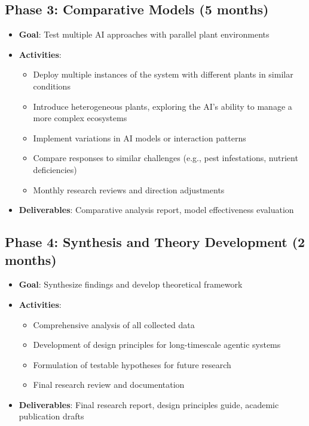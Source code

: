 \documentclass[12pt,letterpaper]{article}
\begin{document}
\subsection{Phase 3: Comparative Models (5 months)}
\begin{itemize}
    \item \textbf{Goal}: Test multiple AI approaches with parallel plant environments
    \item \textbf{Activities}:
    \begin{itemize}
        \item Deploy multiple instances of the system with different plants in similar conditions
        \item Introduce heterogeneous plants, exploring the AI's ability to manage a more complex ecosystems
        \item Implement variations in AI models or interaction patterns
        \item Compare responses to similar challenges (e.g., pest infestations, nutrient deficiencies)
        \item Monthly research reviews and direction adjustments
    \end{itemize}
    \item \textbf{Deliverables}: Comparative analysis report, model effectiveness evaluation
\end{itemize}

\subsection{Phase 4: Synthesis and Theory Development (2 months)}
\begin{itemize}
    \item \textbf{Goal}: Synthesize findings and develop theoretical framework
    \item \textbf{Activities}:
    \begin{itemize}
        \item Comprehensive analysis of all collected data
        \item Development of design principles for long-timescale agentic systems
        \item Formulation of testable hypotheses for future research
        \item Final research review and documentation
    \end{itemize}
    \item \textbf{Deliverables}: Final research report, design principles guide, academic publication drafts
\end{itemize}
\end{document}

